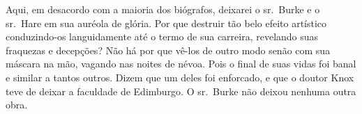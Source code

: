 Aqui, em desacordo com a maioria dos biógrafos, deixarei o sr.~Burke e o
sr.~Hare em sua auréola de glória. Por que destruir tão belo efeito
artístico conduzindo-os languidamente até o termo de sua carreira,
revelando suas fraquezas e decepções? Não há por que vê-los de outro modo
senão com sua máscara na mão, vagando nas noites de névoa. Pois o final de
suas vidas foi banal e similar a tantos outros. Dizem que um deles foi
enforcado, e que o doutor Knox teve de deixar a faculdade de Edimburgo. O
sr.~Burke não deixou nenhuma outra obra.


